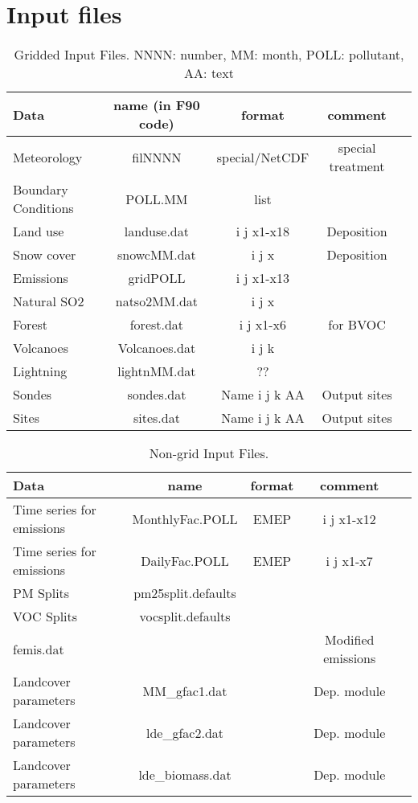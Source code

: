 \chapter{Input files}

\begin{table}[h]
\caption{Gridded Input Files. NNNN: number, MM: month, POLL: pollutant, AA: text}
\begin{tabular}{lcccc}\hline
Data & name (in F90 code) & format& comment\\ \hline
Meteorology&filNNNN&special/NetCDF& special treatment \\
Boundary Conditions&POLL.MM&list&\\
Land use&landuse.dat&i j x1-x18& Deposition \\ %
Snow cover&snowcMM.dat&i j x& Deposition\\
Emissions&gridPOLL&i j x1-x13&\\
Natural SO2&natso2MM.dat&i j x&\\
Forest&forest.dat&i j x1-x6&for BVOC \\ %
Volcanoes&Volcanoes.dat&i j k&   \\ %
Lightning&lightnMM.dat&??& \\
Sondes&sondes.dat& Name i j k AA& Output sites\\
Sites&sites.dat  & Name i j k AA& Output sites\\ \hline
\end{tabular}
\end{table}
 

\begin{table}[h]
\caption{Non-grid Input Files.}
\begin{tabular}{lcccc}\hline
Data & name   &format& comment\\ \hline
Time series for emissions&MonthlyFac.POLL&EMEP&i j x1-x12&\\
Time series for emissions&DailyFac.POLL&EMEP&i j x1-x7&\\
PM Splits                   &pm25split.defaults&& \\
VOC Splits&vocsplit.defaults&& \\
femis.dat           &             & & Modified emissions \\
Landcover parameters&MM\_gfac1.dat&& Dep. module \\
Landcover parameters&lde\_gfac2.dat&& Dep. module \\
Landcover parameters&lde\_biomass.dat&&Dep. module  \\\hline
\end{tabular}
\end{table}
